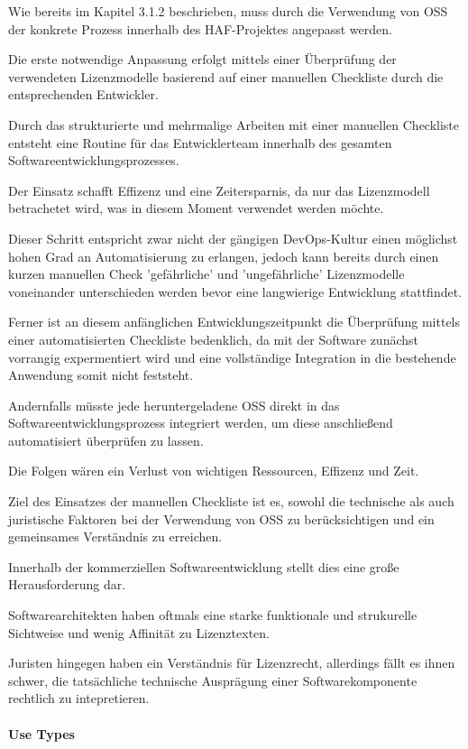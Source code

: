 Wie bereits im Kapitel 3.1.2 beschrieben, muss durch die Verwendung von OSS der konkrete Prozess innerhalb des HAF-Projektes angepasst werden. 

Die erste notwendige Anpassung erfolgt mittels einer Überprüfung der verwendeten Lizenzmodelle basierend auf einer manuellen Checkliste durch die entsprechenden Entwickler.  

Durch das strukturierte und mehrmalige Arbeiten mit einer manuellen Checkliste entsteht eine Routine für das Entwicklerteam innerhalb des gesamten Softwareentwicklungsprozesses. 

Der Einsatz schafft Effizenz und eine Zeitersparnis, da nur das Lizenzmodell betrachetet wird, was in diesem Moment verwendet werden möchte. 

Dieser Schritt entspricht zwar nicht der gängigen DevOps-Kultur einen möglichst hohen Grad an Automatisierung zu erlangen, jedoch kann bereits durch einen kurzen manuellen Check 'gefährliche' und 'ungefährliche' Lizenzmodelle voneinander unterschieden werden bevor eine langwierige Entwicklung stattfindet. 

Ferner ist an diesem anfänglichen Entwicklungszeitpunkt die Überprüfung mittels einer automatisierten Checkliste bedenklich, da mit der Software zunächst vorrangig expermentiert wird und eine vollständige Integration in die bestehende Anwendung somit nicht feststeht.

Andernfalls müsste jede heruntergeladene OSS direkt in das Softwareentwicklungsprozess integriert werden, um diese anschließend automatisiert überprüfen zu lassen.

Die Folgen wären ein Verlust von wichtigen Ressourcen, Effizenz und Zeit.

Ziel des Einsatzes der manuellen Checkliste ist es, sowohl die technische als auch juristische Faktoren bei der Verwendung von OSS zu berücksichtigen und ein gemeinsames Verständnis zu erreichen.

Innerhalb der kommerziellen Softwareentwicklung stellt dies eine große Herausforderung dar.

Softwarearchitekten haben oftmals eine starke funktionale und strukurelle Sichtweise und wenig Affinität zu Lizenztexten. 

Juristen hingegen haben ein Verständnis für Lizenzrecht, allerdings fällt es ihnen schwer, die tatsächliche technische Ausprägung einer Softwarekomponente rechtlich zu intepretieren. 

\paragraph{Use Types}

